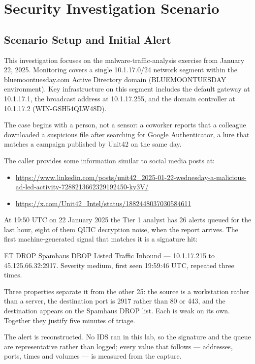 \section{Security Investigation Scenario}
\label{sec:investigation}

\subsection{Scenario Setup and Initial Alert}

This investigation focuses on the malware-traffic-analysis exercise from January 22, 2025. Monitoring covers a single 10.1.17.0/24 network segment within the bluemoontuesday.com Active Directory domain (BLUEMOONTUESDAY environment). Key infrastructure on this segment includes the default gateway at 10.1.17.1, the broadcast address at 10.1.17.255, and the domain controller at 10.1.17.2 (WIN-GSH54QLW48D).

The case begins with a person, not a sensor: a coworker reports that a colleague downloaded a suspicious file after searching for Google Authenticator, a lure that matches a campaign published by Unit42 on the same day.

The caller provides some information similar to social media posts at:
\begin{itemize}
  \item \url{https://www.linkedin.com/posts/unit42_2025-01-22-wednesday-a-malicious-ad-led-activity-7288213662329192450-ky3V/}
  \item \url{https://x.com/Unit42_Intel/status/1882448037030584611}
\end{itemize}

At 19:50 UTC on 22 January 2025 the Tier 1 analyst has 26 alerts queued for the last hour, eight of them QUIC decryption noise, when the report arrives. The first machine-generated signal that matches it is a signature hit:

ET DROP Spamhaus DROP Listed Traffic Inbound --- 10.1.17.215 to 45.125.66.32:2917. Severity medium, first seen 19:59:46 UTC, repeated three times.

Three properties separate it from the other 25: the source is a workstation rather than a server, the destination port is 2917 rather than 80 or 443, and the destination appears on the Spamhaus DROP list. Each is weak on its own. Together they justify five minutes of triage.

The alert is reconstructed. No IDS ran in this lab, so the signature and the queue are representative rather than logged; every value that follows --- addresses, ports, times and volumes --- is measured from the capture.

